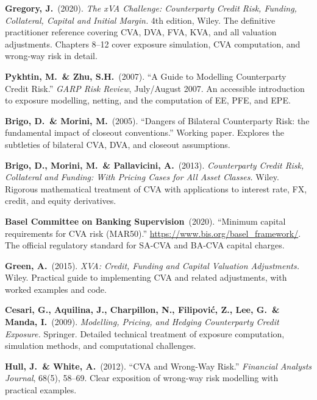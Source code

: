 \documentclass[11pt, a4paper]{article}
\theoremstyle{definition}
\theoremstyle{plain}
\theoremstyle{remark}
\begin{document}
\begin{enumerate}[label={[\arabic*]}, leftmargin=2cm]
    \item \textbf{Gregory, J.}\ (2020).
          \emph{The xVA Challenge: Counterparty Credit Risk, Funding, Collateral, Capital and Initial Margin.}
          4th edition, Wiley.
          The definitive practitioner reference covering CVA, DVA, FVA, KVA,
          and all valuation adjustments.
          Chapters 8--12 cover exposure simulation, CVA computation, and wrong-way risk in detail.

    \item \textbf{Pykhtin, M.\ \& Zhu, S.H.}\ (2007).
          ``A Guide to Modelling Counterparty Credit Risk.''
          \emph{GARP Risk Review}, July/August 2007.
          An accessible introduction to exposure modelling, netting,
          and the computation of EE, PFE, and EPE\@.

    \item \textbf{Brigo, D.\ \& Morini, M.}\ (2005).
          ``Dangers of Bilateral Counterparty Risk: the fundamental impact
          of closeout conventions.''
          Working paper.
          Explores the subtleties of bilateral CVA, DVA, and closeout
          assumptions.

    \item \textbf{Brigo, D., Morini, M.\ \& Pallavicini, A.}\ (2013).
          \emph{Counterparty Credit Risk, Collateral and Funding:
          With Pricing Cases for All Asset Classes.}
          Wiley.
          Rigorous mathematical treatment of CVA with applications
          to interest rate, FX, credit, and equity derivatives.

    \item \textbf{Basel Committee on Banking Supervision}\ (2020).
          ``Minimum capital requirements for CVA risk (MAR50).''
          \url{https://www.bis.org/basel_framework/}.
          The official regulatory standard for SA-CVA and BA-CVA capital charges.

    \item \textbf{Green, A.}\ (2015).
          \emph{XVA: Credit, Funding and Capital Valuation Adjustments.}
          Wiley.
          Practical guide to implementing CVA and related adjustments,
          with worked examples and code.

    \item \textbf{Cesari, G., Aquilina, J., Charpillon, N., Filipovi\'c, Z.,
          Lee, G.\ \& Manda, I.}\ (2009).
          \emph{Modelling, Pricing, and Hedging Counterparty Credit Exposure.}
          Springer.
          Detailed technical treatment of exposure computation, simulation methods,
          and computational challenges.

    \item \textbf{Hull, J.\ \& White, A.}\ (2012).
          ``CVA and Wrong-Way Risk.''
          \emph{Financial Analysts Journal}, 68(5), 58--69.
          Clear exposition of wrong-way risk modelling with practical examples.
\end{enumerate}
\end{document}

